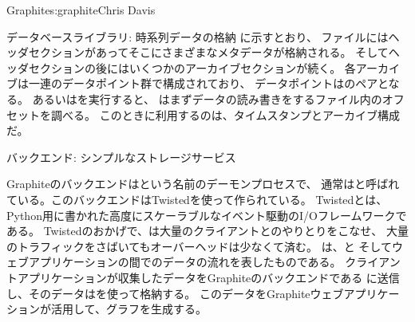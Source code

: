\begin{aosachapter}{Graphite}{s:graphite}{Chris Davis}
\begin{aosasect1}{データベースライブラリ: 時系列データの格納}
に示すとおり、
ファイルにはヘッダセクションがあってそこにさまざまなメタデータが格納される。
そしてヘッダセクションの後にはいくつかのアーカイブセクションが続く。
各アーカイブは一連のデータポイント群で構成されており、
データポイントはのペアとなる。
あるいはを実行すると、
はまずデータの読み書きをするファイル内のオフセットを調べる。
このときに利用するのは、タイムスタンプとアーカイブ構成だ。

\end{aosasect1}

\begin{aosasect1}{バックエンド: シンプルなストレージサービス}

Graphiteのバックエンドはという名前のデーモンプロセスで、
通常はと呼ばれている。このバックエンドはTwistedを使って作られている。
Twistedとは、Python用に書かれた高度にスケーラブルなイベント駆動のI/Oフレームワークである。
Twistedのおかげで、は大量のクライアントとのやりとりをこなせ、
大量のトラフィックをさばいてもオーバーヘッドは少なくて済む。
は、と
そしてウェブアプリケーションの間でのデータの流れを表したものである。
クライアントアプリケーションが収集したデータをGraphiteのバックエンドである
に送信し、そのデータはを使って格納する。
このデータをGraphiteウェブアプリケーションが活用して、グラフを生成する。


\end{aosasect1}
\end{aosachapter}
